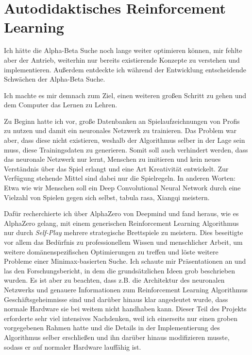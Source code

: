 \documentclass{jpp}
\begin{document}
\section{Autodidaktisches Reinforcement Learning}
Ich hätte die Alpha-Beta Suche noch lange weiter optimieren können, mir fehlte aber der Antrieb, weiterhin nur bereits existierende Konzepte zu verstehen und implementieren. Außerdem entdeckte ich während der Entwicklung entscheidende Schwächen der Alpha-Beta Suche.

Ich machte es mir demnach zum Ziel, einen weiteren großen Schritt zu gehen und dem Computer das Lernen zu Lehren. 

Zu Beginn hatte ich vor, große Datenbanken an Spielaufzeichnungen von Profis zu nutzen und damit ein neuronales Netzwerk zu trainieren. Das Problem war aber, dass diese nicht existieren, weshalb der Algorithmus selber in der Lage sein muss, diese Trainingsdaten zu generieren. Somit soll auch verhindert werden, dass das neuronale Netzwerk nur lernt, Menschen zu imitieren und kein neues Verständnis über das Spiel erlangt und eine Art Kreativität entwickelt. Zur Verfügung stehende Mittel sind dabei nur die Spielregeln. In anderen Worten: Etwa wie wir Menschen soll ein Deep Convolutional Neural Network durch eine Vielzahl von Spielen gegen sich selbst, tabula rasa, Xiangqi meistern. 

Dafür recherchierte ich über AlphaZero von Deepmind und fand heraus, wie es AlphaZero gelang, mit einem generischen Reinforcement Learning Algorithmus nur durch \textit{Self-Play} mehrere strategische Brettspiele zu meistern. Dies beseitigte vor allem das Bedürfnis zu professionellem Wissen und menschlicher Arbeit, um weitere domänenspezifischen Optimierungen zu treffen und löste weitere Probleme einer Minimax-basierten Suche.
Ich schaute mir Präsentationen an und  las den Forschungsbericht, in dem die grundsätzlichen Ideen grob beschrieben wurden. Es ist aber zu beachten, dass z.B. die Architektur des neuronalen Netzwerks und genauere Informationen zum Reinforcement Learning Algorithmus Geschäftsgeheimnisse sind und darüber hinaus klar angedeutet wurde, dass normale Hardware sie bei weitem nicht handhaben kann. Dieser Teil des Projekts erforderte sehr viel intensives Nachdenken, weil ich einerseits nur einen groben vorgegebenen Rahmen hatte und die Details in der Implementierung des Algorithmus selber erschließen und ihn darüber hinaus modifizieren musste, sodass er auf normaler Hardware lauffähig ist.
\end{document}
